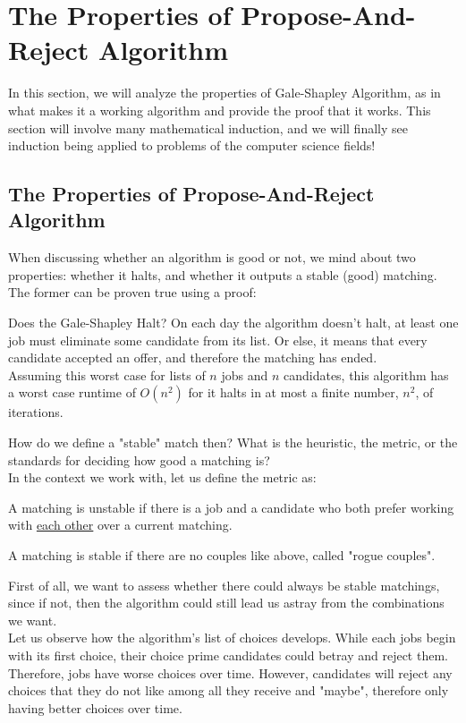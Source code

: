 \section{The Properties of Propose-And-Reject Algorithm}
In this section, we will analyze the properties of Gale-Shapley Algorithm, as in what makes it a working algorithm and provide the proof that it works. This section will involve many mathematical induction, and we will finally see induction being applied to problems of the computer science fields!

\subsection{The Properties of Propose-And-Reject Algorithm}
When discussing whether an algorithm is good or not, we mind about two properties: whether it halts, and whether it outputs a stable (good) matching. \\
The former can be proven true using a proof:
\begin{ln-think}{Does the Gale-Shapley Halt?}{}
    On each day the algorithm doesn't halt, at least one job must eliminate some candidate from its list. Or else, it means that every candidate accepted an offer, and therefore the matching has ended. \\
    Assuming this worst case for lists of $n$ jobs and $n$ candidates, this algorithm has a worst case runtime of $O(n ^ 2)$ for it halts in at most a finite number, $n ^ 2$, of iterations.
\end{ln-think}
How do we define a "stable" match then? What is the heuristic, the metric, or the standards for deciding how good a matching is? \\
In the context we work with, let us define the metric as:
\begin{bindenum}
    \item A matching is unstable if there is a job and a candidate who both prefer working with \underline{each other} over a current matching.
    \item A matching is stable if there are no couples like above, called "rogue couples".
\end{bindenum}
First of all, we want to assess whether there could always be stable matchings, since if not, then the algorithm could still lead us astray from the combinations we want. \\
Let us observe how the algorithm's list of choices develops. While each jobs begin with its first choice, their choice prime candidates could betray and reject them. Therefore, jobs have worse choices over time. However, candidates will reject any choices that they do not like among all they receive and "maybe", therefore only having better choices over time. \\
